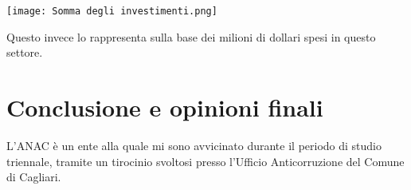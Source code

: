 \documentclass{article}
\begin{document}
\begin{center}
    \texttt{[image: Somma degli investimenti.png]}
\end{center}
\begin{justify}
    Questo invece lo rappresenta sulla base dei milioni di dollari spesi in questo settore.
\end{justify}

\newpage \centering
\section{Conclusione e opinioni finali}
\begin{justify}
    L'ANAC è un ente alla quale mi sono avvicinato durante il periodo di studio triennale, tramite un tirocinio svoltosi presso l'Ufficio Anticorruzione del Comune di Cagliari. 
\end{justify}

\begin{justify}
    
    
\end{justify}
\end{document}
